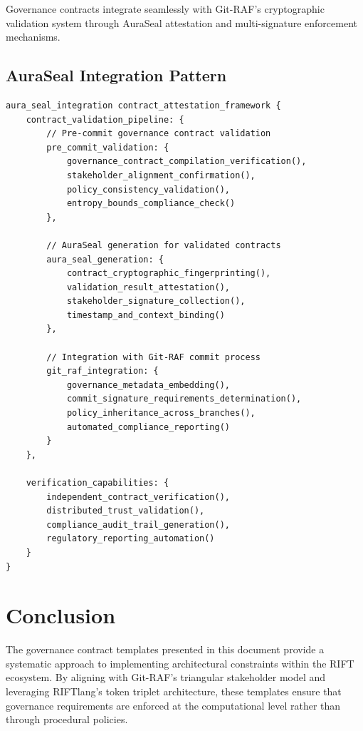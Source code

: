 \documentclass[11pt,letterpaper]{article}
\begin{document}
Governance contracts integrate seamlessly with Git-RAF's cryptographic validation system through AuraSeal attestation and multi-signature enforcement mechanisms.

\subsection{AuraSeal Integration Pattern}

\begin{lstlisting}[language=rift, caption=AuraSeal Integration for Governance Contracts]
aura_seal_integration contract_attestation_framework {
    contract_validation_pipeline: {
        // Pre-commit governance contract validation
        pre_commit_validation: {
            governance_contract_compilation_verification(),
            stakeholder_alignment_confirmation(),
            policy_consistency_validation(),
            entropy_bounds_compliance_check()
        },
        
        // AuraSeal generation for validated contracts
        aura_seal_generation: {
            contract_cryptographic_fingerprinting(),
            validation_result_attestation(),
            stakeholder_signature_collection(),
            timestamp_and_context_binding()
        },
        
        // Integration with Git-RAF commit process
        git_raf_integration: {
            governance_metadata_embedding(),
            commit_signature_requirements_determination(),
            policy_inheritance_across_branches(),
            automated_compliance_reporting()
        }
    },
    
    verification_capabilities: {
        independent_contract_verification(),
        distributed_trust_validation(),
        compliance_audit_trail_generation(),
        regulatory_reporting_automation()
    }
}
\end{lstlisting}

\section{Conclusion}

The governance contract templates presented in this document provide a systematic approach to implementing architectural constraints within the RIFT ecosystem. By aligning with Git-RAF's triangular stakeholder model and leveraging RIFTlang's token triplet architecture, these templates ensure that governance requirements are enforced at the computational level rather than through procedural policies.
\end{document}
